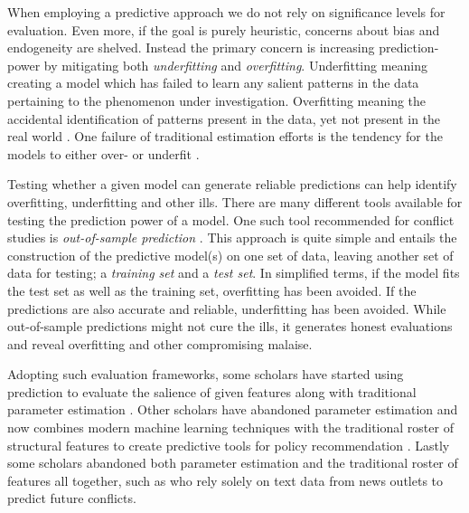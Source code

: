 \documentclass[a4paper]{article}
\begin{document}
When employing a predictive approach we do not rely on significance levels for evaluation. Even more, if the goal is purely heuristic, concerns about bias and endogeneity are shelved. Instead the primary concern is increasing prediction-power by mitigating both \emph{underfitting} and \emph{overfitting}. Underfitting meaning creating a model which has failed to learn any salient patterns in the data pertaining to the phenomenon under investigation. Overfitting meaning the accidental identification of patterns present in the data, yet not present in the real world \citep[165-168]{Mcelreath_2018}. One failure of traditional estimation efforts is the tendency for the models to either over- or underfit \citep[364]{Ward_Greenhill_Bakke_2010}.\par 

Testing whether a given model can generate reliable predictions can help identify overfitting, underfitting and other ills. There are many different tools available for testing the prediction power of a model. One such tool recommended for conflict studies is \emph{out-of-sample prediction} \citep{king_zeng_2001b, Ward_Greenhill_Bakke_2010, perry_2013, Schrodt_2014}. This approach is quite simple and entails the construction of the predictive model(s) on one set of data, leaving another set of data for testing; a \emph{training set} and a \emph{test set}. In simplified terms, if the model fits the test set as well as the training set, overfitting has been avoided. If the predictions are also accurate and reliable, underfitting has been avoided. While out-of-sample predictions might not cure the ills, it generates honest evaluations and reveal overfitting and other compromising malaise.\par

Adopting such evaluation frameworks, some scholars have started using prediction to evaluate the salience of given features along with traditional parameter estimation \citep{Goldstone_2010}. Other scholars have abandoned parameter estimation and now combines modern machine learning techniques with the traditional roster of structural features to create predictive tools for policy recommendation \citep{perry_2013}. Lastly some scholars abandoned both parameter estimation and the traditional roster of features all together, such as \cite{mueller_2016} who rely solely on text data from news outlets to predict future conflicts.\par
\end{document}
